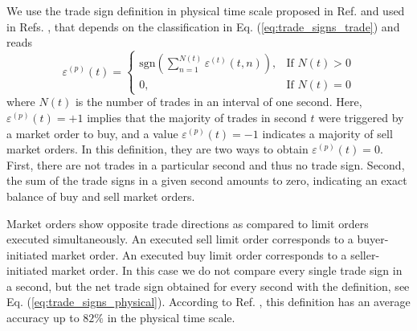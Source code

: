We use the trade sign definition in physical time scale proposed in Ref.
\cite{Wang_2016_cross} and used in Refs.
\cite{Wang_2017,Wang_2016_avg}, that depends on the classification in
Eq. (\ref{eq:trade_signs_trade}) and reads
\begin{equation}\label{eq:trade_signs_physical}
    \varepsilon^{\left(p\right)}\left(t\right)=\left\{
    \begin{array}{cc}
    \text{sgn}\left(\sum_{n=1}^{N\left(t\right)}\varepsilon^{\left(t\right)}
    \left(t,n\right)\right),
    & \text{If }N \left(t\right)>0\\
    0, & \text{If }N\left(t\right)=0
    \end{array}\right.
\end{equation}
where $N \left(t \right)$ is the number of trades in an interval of one second.
Here, $\varepsilon^{\left(p\right)}\left( t \right) = +1$ implies that the
majority of trades in second $t$ were triggered by a market order to buy, and a
value $\varepsilon^{\left(p\right)}\left( t \right) = -1$ indicates a majority
of sell market orders. In this definition, they are two ways to obtain
$\varepsilon^{\left(p\right)}\left( t \right) = 0$. First, there are not trades
in a particular second and thus no trade sign. Second, the sum of the trade
signs in a given second amounts to zero, indicating an exact balance of buy and
sell market orders.

Market orders show opposite trade directions as compared to limit orders
executed simultaneously. An executed sell limit order corresponds to a
buyer-initiated market order. An executed buy limit order corresponds to a
seller-initiated market order. In this case we do not compare every single
trade sign in a second, but the net trade sign obtained for every second with
the definition, see Eq. (\ref{eq:trade_signs_physical}). According to Ref.
\cite{Wang_2016_cross}, this definition has an average accuracy up to $82\%$ in
the physical time scale.
